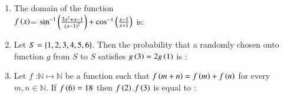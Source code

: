\documentclass[journal]{IEEEtran}
\begin{document}
\begin{enumerate}[start=1]
\begin{enumerate}
\end{enumerate}
\item %
The domain of the function \\
$f\left(x\right)$= $\sin ^{-1} \left(\frac{3x^2+x-1}{\left(x-1\right)^2}\right)+\cos ^{-1} \left(\frac{x-1}{x+1}\right)$ is:
\begin{enumerate}
\end{enumerate}
\item %
Let $S= \left\{1,2,3,4,5,6\right\}$. Then the probability that a randomly chosen onto function $g$ from $S$ to $S$ satisfies $g\left(3\right)=2g\left(1\right)$ is :
\begin{enumerate}
\end{enumerate}
\item %
Let $f$ :$ \mathbb{N} \mapsto \mathbb{N}$ be a  function such that $f\left(m+n\right)=f\left(m\right)+f\left(n\right)$ for every $m,n \in \mathbb{N}$. If $f\left(6\right)=18$ then $f\left(2\right)$.$f\left(3\right)$ is equal to :
\begin{enumerate}
\begin{multicols}{2}

\end{multicols}
\end{enumerate}
\end{enumerate}
\end{document}
